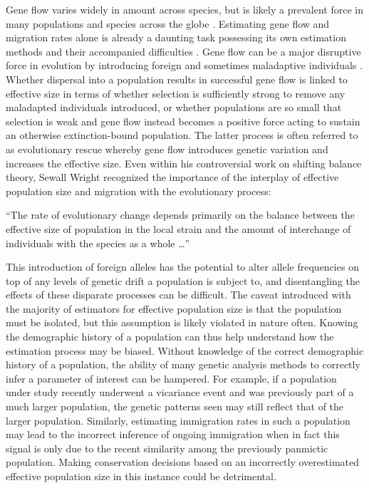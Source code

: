 Gene flow varies widely in amount across species, but is likely a prevalent force in many populations and species across the globe \citep{Slatkin:1985, Slatkin:1987}. 
Estimating gene flow and migration rates alone is already a daunting task possessing its own estimation methods and their accompanied difficulties \citep{Beerli:2001, Hey:2004, Kuhner:2006, Whitlock:1999}. Gene flow can be a major disruptive force in evolution by introducing foreign and sometimes maladaptive individuals \citep{Slatkin:1987}. Whether dispersal into a population results in successful gene flow is linked to effective size in terms of whether selection is sufficiently strong to remove any maladapted individuals introduced, or whether populations are so small that selection is weak and gene flow instead becomes a positive force acting to sustain an otherwise extinction-bound population. The latter process is often referred to as evolutionary rescue whereby gene flow introduces genetic variation and increases the effective size. Even within his controversial work on shifting balance theory, Sewall Wright recognized the importance of the interplay of effective population size and migration with the evolutionary process: %
\begin{quoteshrink}
  ``The rate of evolutionary change depends primarily on the balance between the effective size of population in the local strain and the amount of interchange of individuals with the species as a whole \dots''
  \hfill\citet{Wright:1930}
\end{quoteshrink}
This introduction of foreign alleles has the potential to alter allele frequencies on top of any levels of genetic drift a population is subject to, and disentangling the effects of these disparate processes can be difficult. The caveat introduced with the majority of estimators for effective population size is that the population must be isolated, but this assumption is likely violated in nature often. Knowing the demographic history of a population can thus help understand how the estimation process may be biased. Without knowledge of the correct demographic history of a population, the ability of many genetic analysis methods to correctly infer a parameter of interest can be hampered. For example, if a population under study recently underwent a vicariance event and was previously part of a much larger population, the genetic patterns seen may still reflect that of the larger population. Similarly, estimating immigration rates in such a population may lead to the incorrect inference of ongoing immigration when in fact this signal is only due to the recent similarity among the previously panmictic population. Making conservation decisions based on an incorrectly overestimated effective population size in this instance could be detrimental.

